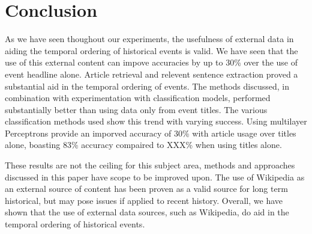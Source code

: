 \documentclass[bsc,frontabs,twoside,singlespacing,parskip,deptreport]{infthesis}     %
\begin{document}


\chapter{Conclusion}
As we have seen thoughout our experiments, the usefulness of external data in aiding the temporal ordering
of historical events is valid. We have seen that the use of this external content can impove accuracies by up to
30\% over the use of event headline alone.
Article retrieval and relevent sentence extraction proved a substantial aid in the temporal ordering of events.
The methods discussed, in combination with experimentation with classification models, performed substantially better
than using data only from event titles.
The various classification methods used show this trend with varying success. Using multilayer Perceptrons provide an
imporved accuracy of 30\% with article usage over titles alone, boasting 83\% accuracy compaired to XXX\% when using titles
alone.


These results are not the ceiling for this subject area, methods and approaches discussed in this paper have scope
to be improved upon. The use of Wikipedia as an external source of content has been proven as a valid source for
long term historical, but may pose issues if applied to recent history. Overall, we have shown that the use of external
data sources, such as Wikipedia, do aid in the temporal ordering of historical events.


\end{document}
